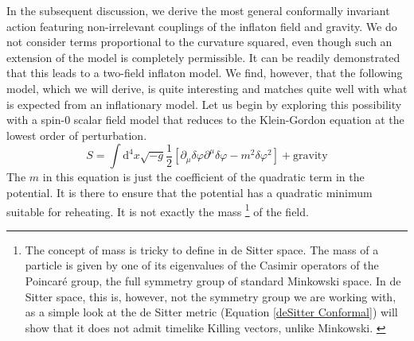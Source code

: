 \documentclass[aps,prd,reprint,preprintnumbers,showpacs,floatfix,nofootinbib,superscript address]{revtex4-2}
\begin{document}
In the subsequent discussion, we derive the most general conformally invariant action featuring non-irrelevant couplings of the inflaton field and gravity. We do not consider terms proportional to the curvature squared, even though such an extension of the model is completely permissible. It can be readily demonstrated that this leads to a two-field inflaton model. We find, however, that the following model, which we will derive, is quite interesting and matches quite well with what is expected from an inflationary model. Let us begin by exploring this possibility with a spin-0 scalar field model that reduces to the Klein-Gordon equation at the lowest order of perturbation.
\begin{equation} \label{25}
    S = \int \mathrm{d}^4 x \sqrt{-g} \frac{1}{2} \left[ \partial_\mu \delta \varphi \partial^\mu \delta \varphi - m^2   \delta\varphi^2   \right] + \text{gravity}
\end{equation}
The $m$ in this equation is just the coefficient of the quadratic term in the potential. It is there to ensure that the potential has a quadratic minimum suitable for reheating. It is not exactly the mass \footnote{The concept of mass is tricky to define in de Sitter space. The mass of a particle is given by one of its eigenvalues of the Casimir operators of the Poincaré group, the full symmetry group of standard Minkowski space. In de Sitter space, this is, however, not the symmetry group we are working with, as a simple look at the de Sitter metric (Equation \ref{deSitter Conformal}) will show that it does not admit timelike Killing vectors, unlike Minkowski. \label{Footnote 1}} of the field.
\end{document}
